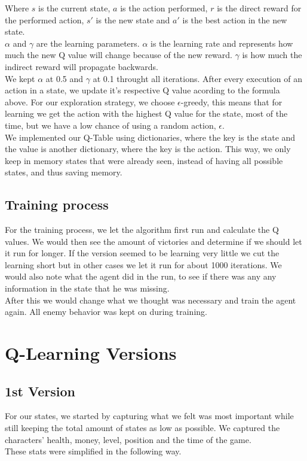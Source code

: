 \documentclass{article}
\begin{document}
  \noindent
  Where $s$ is the current state, $a$ is the action performed, $r$ is the direct reward for the performed action,
  $s'$ is the new state and $a'$ is the best action in the new state.\\
  $\alpha$ and $\gamma$ are the learning parameters.
  $\alpha$ is the learning rate and represents how much the new Q value will change because of the new reward.
  $\gamma$ is how much the indirect reward will propagate backwards.\\
  We kept $\alpha$ at 0.5 and $\gamma$ at 0.1 throught all iterations.
  \noindent
  After every execution of an action in a state, we update it's respective Q value acording to the formula above. 
  For our exploration strategy, we choose $\epsilon$-greedy, this means that for learning we get the action with the highest Q value for
  the state, most of the time, but we have a low chance of using a random action, $\epsilon$.\\
  We implemented our Q-Table using dictionaries, where the key is the state and the value is another dictionary, where the key is the action. This way,
  we only keep in memory states that were already seen, instead of having all possible states, and thus saving memory.\\
  
  \subsection{Training process}
  For the training process, we let the algorithm first run and calculate the Q values.
  We would then see the amount of victories and determine if we should let it run for longer. If the version seemed to be learning very little
  we cut the learning short but in other cases we let it run for about 1000 iterations.
  We would also note what the agent did in the run, to see if there was any any information
  in the state that he was missing.\\
  After this we would change what we thought was necessary and train the agent again. All enemy behavior was kept on during training.

  \section{Q-Learning Versions}
  \subsection{1st Version}
  For our states, we started by capturing what we felt was most important while still keeping the total amount of states as low as possible.
  We captured the characters' health, money, level, position and the time of the game.\\
  These stats were simplified in the following way.\\
\end{document}
